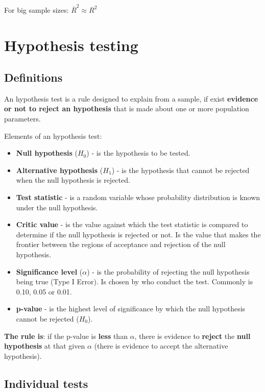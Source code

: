 \documentclass[10pt, a4paper, landscape]{extarticle}
\begin{document}
\begin{multicols}{3}
For big sample sizes: $\overline{R}^2 \approx R^2$

\section*{Hypothesis testing}

\subsection*{Definitions}

An hypothesis test is a rule designed to explain from a sample, if exist \textbf{evidence or not to reject an hypothesis} that is made about one or more population parameters.

Elements of an hypothesis test:

\begin{itemize}[leftmargin=*]
	\item \textbf{Null hypothesis} ($H_0$) - is the hypothesis to be tested.
	\item \textbf{Alternative hypothesis} ($H_1$) - is the hypothesis that cannot be rejected when the null hypothesis is rejected.
	\item \textbf{Test statistic} - is a random variable whose probability distribution is known under the null hypothesis.
	\item \textbf{Critic value} - is the value against which the test statistic is compared to determine if the null hypothesis is rejected or not. Is the value that makes the frontier between the regions of acceptance and rejection of the null hypothesis.
	\item \textbf{Significance level} ($\alpha$) - is the probability of rejecting the null hypothesis being true (Type I Error). Is chosen by who conduct the test. Commonly is 0.10, 0.05 or 0.01.
	\item \textbf{p-value} - is the highest level of significance by which the null hypothesis cannot be rejected ($H_0$).
\end{itemize}

\textbf{The rule is}: if the p-value is \textbf{less} than $\alpha$, there is evidence to \textbf{reject} the \textbf{null hypothesis} at that given $\alpha$ (there is evidence to accept the alternative hypothesis).

\subsection*{Individual tests}


\end{multicols}
\end{document}
